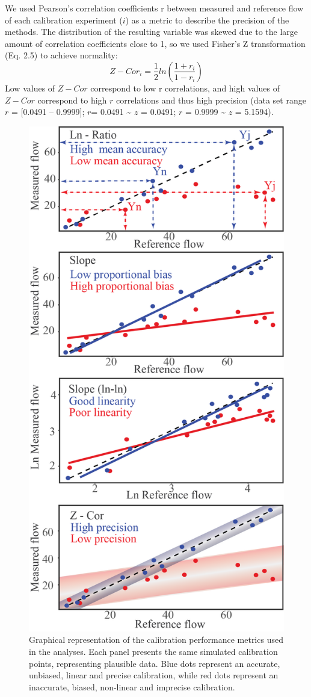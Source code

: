 \documentclass[11pt,twoside]{reedthesis}
\begin{document}
We used Pearson's correlation coefficients r between measured and
reference flow of each calibration experiment (\(i\)) as a metric to
describe the precision of the methods. The distribution of the resulting
variable was skewed due to the large amount of correlation coefficients
close to 1, so we used Fisher's Z transformation (Eq. 2.5) to achieve
normality:
\begin{equation}
Z-Cor_i = \frac{1}{2}ln(\frac{1+r_i}{1-r_i})
\end{equation}
Low values of \(Z-Cor\) correspond to low r correlations, and high
values of \(Z-Cor\) correspond to high \(r\) correlations and thus high
precision (data set range \(r\) = {[}0.0491 -- 0.9999{]}; \(r\)= 0.0491
\textasciitilde{} \(z\) = 0.0491; \(r\) = 0.9999 \textasciitilde{} \(z\)
= 5.1594).\par
\begin{figure}[hbt!]

{\centering \includegraphics[width=0.55\linewidth]{figure/CH2/PLOTMETRICS} 

}

\caption[Graphical representation of the calibration performance metrics.]{Graphical representation of the calibration performance metrics used in the analyses. Each panel presents the same simulated calibration points, representing plausible data. Blue dots represent an accurate, unbiased, linear and precise calibration, while red dots represent an inaccurate, biased, non-linear and imprecise calibration.}\label{fig:ch2fig1}
\end{figure}
\end{document}
